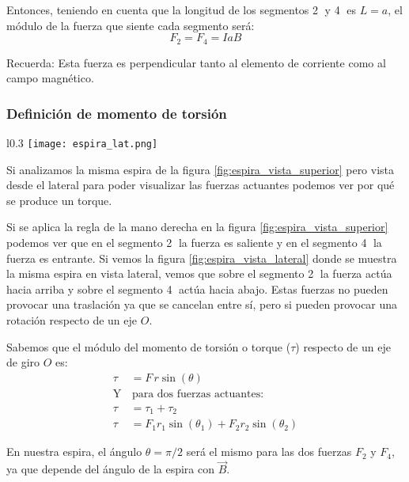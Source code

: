 Entonces, teniendo en cuenta que la longitud de los segmentos \textcircled{2} y \textcircled{4} es \(L=a\), el módulo de la fuerza que siente cada segmento será:
\begin{equation}
  F_{2} = F_{4} = IaB
  \label{eq:fuerza_torque_en_una_espira}
\end{equation}

\begin{tcolorbox}[myconclusion]
  Recuerda: Esta fuerza es perpendicular tanto al elemento de corriente como al campo magnético.
\end{tcolorbox}

\subsubsection{Definición de momento de torsión}

\begin{wrapfigure}{l}{0.3\textwidth}
  \centering
  \texttt{[image: espira\_lat.png]}
  \caption{Vista lateral de la espira rectangular}
  \label{fig:espira_vista_lateral}
\end{wrapfigure}
Si analizamos la misma espira de la figura \ref{fig:espira_vista_superior} pero vista desde el lateral para poder visualizar las fuerzas actuantes podemos ver por qué se produce un torque.

Si se aplica la regla de la mano derecha en la figura \ref{fig:espira_vista_superior} podemos ver que en el segmento \textcircled{2} la fuerza es saliente y en el segmento \textcircled{4} la fuerza es entrante. Si vemos la figura \ref{fig:espira_vista_lateral} donde se muestra la misma espira en vista lateral, vemos que sobre el segmento \textcircled{2} la fuerza actúa hacia arriba y sobre el segmento \textcircled{4} actúa hacia abajo. Estas fuerzas no pueden provocar una traslación ya que se cancelan entre sí, pero si pueden provocar una rotación respecto de un eje \(O\).

Sabemos que el módulo del momento de torsión o torque (\(\tau\)) respecto de un eje de giro \(O\) es:
\begin{align*}
  \tau &= F\, r \sin(\theta) \\
  \text{Y}&\,\text{para dos fuerzas actuantes:}\\
  \tau &= \tau_1 + \tau_2 \\
  \tau &= F_1 r_1 \sin(\theta_1) + F_2 r_2 \sin(\theta_2)  
\end{align*}

En nuestra espira, el ángulo \(\theta=\pi/2\) será el mismo para las dos fuerzas \(F_{2}\) y \(F_{4}\), ya que depende del ángulo de la espira con \(\vec{B}\).

